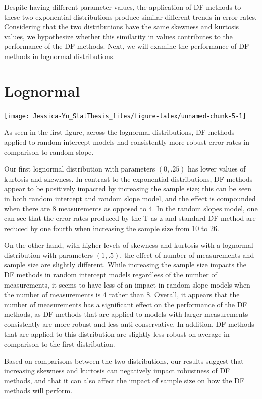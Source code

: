 \documentclass[12pt, twoside]{amherstthesis}
\begin{document}
Despite having different parameter values, the application of DF methods to these two exponential distributions produce similar different trends in error rates. Considering that the two distributions have the same skewness and kurtosis values, we hypothesize whether this similarity in values contributes to the performance of the DF methods. Next, we will examine the performance of DF methods in lognormal distributions.

\hypertarget{lognormal}{%
\section{Lognormal}\label{lognormal}}
\begin{center}\texttt{[image: Jessica-Yu\_StatThesis\_files/figure-latex/unnamed-chunk-5-1]} \end{center}

As seen in the first figure, across the lognormal distributions, DF methods applied to random intercept models had consistently more robust error rates in comparison to random slope.

Our first lognormal distribution with parameters \((0,.25)\) has lower values of kurtosis and skewness. In contrast to the exponential distributions, DF methods appear to be positively impacted by increasing the sample size; this can be seen in both random intercept and random slope model, and the effect is compounded when there are 8 measurements as opposed to 4. In the random slopes model, one can see that the error rates produced by the T-as-z and standard DF method are reduced by one fourth when increasing the sample size from 10 to 26.

On the other hand, with higher levels of skewness and kurtosis with a lognormal distribution with parameters \((1,.5)\), the effect of number of measurements and sample size are slightly different. While increasing the sample size impacts the DF methods in random intercept models regardless of the number of measurements, it seems to have less of an impact in random slope models when the number of measurements is 4 rather than 8. Overall, it appears that the number of measurements has a significant effect on the performance of the DF methods, as DF methods that are applied to models with larger measurements consistently are more robust and less anti-conservative. In addition, DF methods that are applied to this distribution are slightly less robust on average in comparison to the first distribution.

Based on comparisons between the two distributions, our results suggest that increasing skewness and kurtosis can negatively impact robustness of DF methods, and that it can also affect the impact of sample size on how the DF methods will perform.
\end{document}
